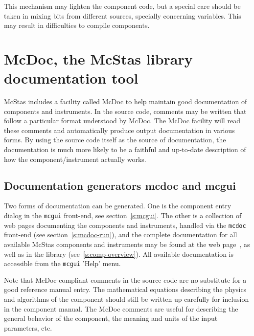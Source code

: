 This mechanism may lighten the component code, but a special care should be taken in mixing bits from different sources, specially concerning variables. This may result in difficulties to compile components.


\section{McDoc, the McStas library documentation tool}
\label{s:mcdoc}

McStas includes a facility called McDoc to help maintain good documentation of
components and instruments. In the source code, comments may be
written that follow a particular format understood by McDoc. The McDoc facility
will read these comments and automatically produce output documentation in
various forms. By using the source code itself as the source of documentation,
the documentation is much more likely to be a faithful and up-to-date
description of how the component/instrument actually works.

\subsection{Documentation generators mcdoc and mcgui}

Two forms of documentation can be generated. One
is the component entry dialog in the \verb+mcgui+ front-end, see
section~\ref{s:mcgui}. The other is a collection of web pages documenting
the components and instruments, handled via the \verb+mcdoc+ front-end (see section~\ref{s:mcdoc-run}), and the complete documentation for all available
McStas components and instruments may be found at the \MCS
web page~\cite{mcstas_webpage}, as well as in the \MCS library
(see~\ref{s:comp-overview}). All available \MCS documentation is accessible from the \verb+mcgui+ 'Help' menu.

Note that McDoc-compliant comments in the source code are no substitute
for a good reference manual entry. The mathematical equations describing
the physics and algorithms of the component should still be written up
carefully for inclusion in the component manual. The McDoc comments are
useful for describing the general behavior of the component, the
meaning and units of the input parameters, etc.



